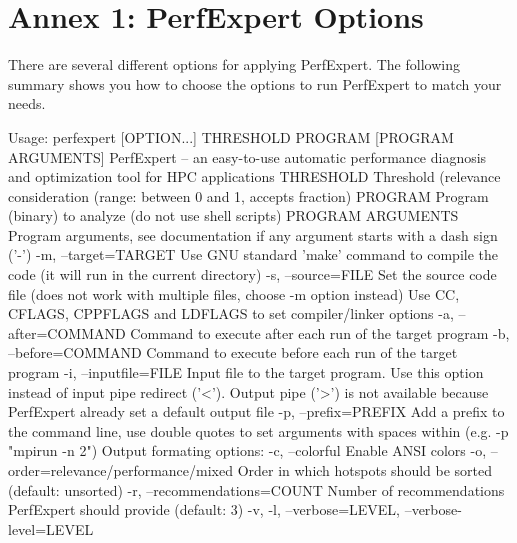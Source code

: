 \chapter{Annex 1: PerfExpert Options}
\label{ch:ch06_perfexpert_options}

There are several different options for applying PerfExpert. The following summary shows you how to choose the options to run PerfExpert to match your needs.

\begin{prompt}
Usage: perfexpert [OPTION...] THRESHOLD PROGRAM [PROGRAM ARGUMENTS]
PerfExpert -- an easy-to-use automatic performance diagnosis and optimization tool for HPC applications
 THRESHOLD           Threshold (relevance %
                     consideration (range: between 0 and 1, accepts fraction)
 PROGRAM             Program (binary) to analyze (do not use shell scripts)
 PROGRAM ARGUMENTS   Program arguments, see documentation if any argument
                     starts with a dash sign ('-')
 -m, --target=TARGET        Use GNU standard 'make' command to compile the
                            code (it will run in the current directory)
 -s, --source=FILE          Set the source code file (does not work with
                            multiple files, choose -m option instead)
Use CC, CFLAGS, CPPFLAGS and LDFLAGS to set compiler/linker options
 -a, --after=COMMAND        Command to execute after each run of the target
                            program
 -b, --before=COMMAND       Command to execute before each run of the target
                            program
 -i, --inputfile=FILE       Input file to the target program. Use this option
                            instead of input pipe redirect ('<'). Output pipe
                            ('>') is not available because PerfExpert already
                            set a default output file
 -p, --prefix=PREFIX        Add a prefix to the command line, use double
                            quotes to set arguments with spaces within (e.g.
                            -p "mpirun -n 2")
Output formating options:
 -c, --colorful             Enable ANSI colors
 -o, --order=relevance/performance/mixed
                            Order in which hotspots should be sorted (default:
                            unsorted)
 -r, --recommendations=COUNT   Number of recommendations PerfExpert should
                            provide (default: 3)
 -v, -l, --verbose=LEVEL, --verbose-level=LEVEL

\end{prompt}
